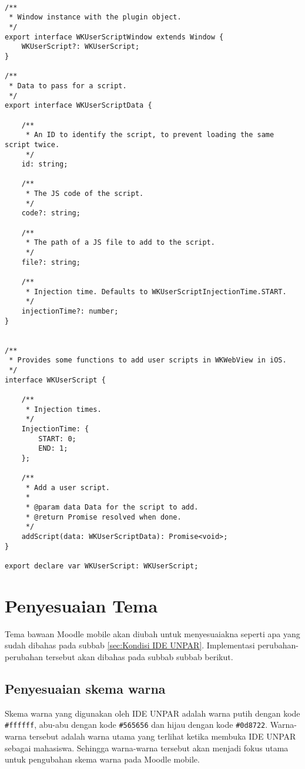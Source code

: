 \begin{lstlisting}[frame=single, label ={index.d.ts}, caption = Perubahan pada \texttt{node\_ modules/cordova-plugin-wkuserscript/types/index.d.ts} ]
	
/**
 * Window instance with the plugin object.
 */
export interface WKUserScriptWindow extends Window {
    WKUserScript?: WKUserScript;
}

/**
 * Data to pass for a script.
 */
export interface WKUserScriptData {

    /**
     * An ID to identify the script, to prevent loading the same script twice.
     */
    id: string;

    /**
     * The JS code of the script.
     */
    code?: string;

    /**
     * The path of a JS file to add to the script.
     */
    file?: string;

    /**
     * Injection time. Defaults to WKUserScriptInjectionTime.START.
     */
    injectionTime?: number;
}


/**
 * Provides some functions to add user scripts in WKWebView in iOS.
 */
interface WKUserScript {

    /**
     * Injection times.
     */
    InjectionTime: {
        START: 0;
        END: 1;
    };

    /**
     * Add a user script.
     *
     * @param data Data for the script to add.
     * @return Promise resolved when done.
     */
    addScript(data: WKUserScriptData): Promise<void>;
}

export declare var WKUserScript: WKUserScript;

\end{lstlisting}

\section{Penyesuaian Tema}
Tema bawaan Moodle mobile akan diubah untuk menyesuaiakna seperti apa yang sudah dibahas pada subbab \ref{sec:Kondisi IDE UNPAR}. Implementasi perubahan-perubahan tersebut akan dibahas pada subbab subbab berikut.

\subsection{Penyesuaian skema warna}
Skema warna yang digunakan oleh IDE UNPAR adalah warna putih dengan kode \texttt{\#ffffff}, abu-abu dengan kode \texttt{\#565656} dan hijau dengan kode \texttt{\#0d8722}.  Warna-warna tersebut adalah warna utama yang terlihat ketika membuka IDE UNPAR sebagai mahasiswa. Sehingga warna-warna tersebut akan menjadi fokus utama untuk pengubahan skema warna pada Moodle mobile.

